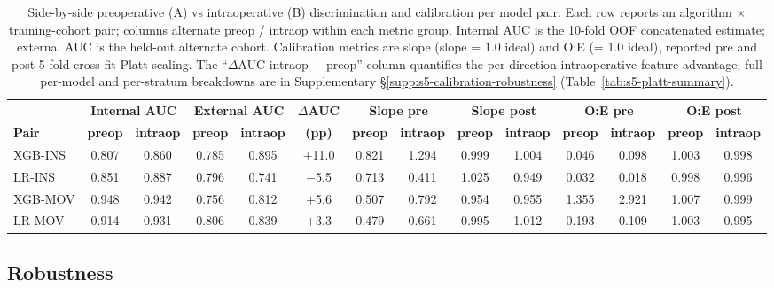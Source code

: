 \begin{table}
\centering
\caption{Side-by-side preoperative (A) vs intraoperative (B) discrimination
and calibration per model pair. Each row reports an algorithm
$\times$ training-cohort pair; columns alternate preop / intraop within
each metric group. Internal AUC is the 10-fold OOF concatenated estimate;
external AUC is the held-out alternate cohort. Calibration metrics are
slope (slope = 1.0 ideal) and O:E (= 1.0 ideal), reported pre and post
5-fold cross-fit Platt scaling. The ``$\Delta$AUC intraop $-$ preop'' column
quantifies the per-direction intraoperative-feature advantage; full
per-model and per-stratum breakdowns are in Supplementary
§\ref{supp:s5-calibration-robustness} (Table~\ref{tab:s5-platt-summary}).}
\label{tab:calibration}
\setlength{\tabcolsep}{6pt}
\small
\begin{tabular}{l|cc|cc|c|cc|cc|cc|cc}
\toprule
& \multicolumn{2}{c|}{\textbf{Internal AUC}} & \multicolumn{2}{c|}{\textbf{External AUC}} & \textbf{$\Delta$AUC} & \multicolumn{2}{c|}{\textbf{Slope pre}} & \multicolumn{2}{c|}{\textbf{Slope post}} & \multicolumn{2}{c|}{\textbf{O:E pre}} & \multicolumn{2}{c}{\textbf{O:E post}} \\
\textbf{Pair} & \textbf{preop} & \textbf{intraop} & \textbf{preop} & \textbf{intraop} & \textbf{(pp)} & \textbf{preop} & \textbf{intraop} & \textbf{preop} & \textbf{intraop} & \textbf{preop} & \textbf{intraop} & \textbf{preop} & \textbf{intraop} \\
\midrule
XGB-INS & 0.807 & 0.860 & 0.785 & 0.895 & $+$11.0 & 0.821 & 1.294 & 0.999 & 1.004 & 0.046 & 0.098 & 1.003 & 0.998 \\
LR-INS  & 0.851 & 0.887 & 0.796 & 0.741 & $-$5.5  & 0.713 & 0.411 & 1.025 & 0.949 & 0.032 & 0.018 & 0.998 & 0.996 \\
XGB-MOV & 0.948 & 0.942 & 0.756 & 0.812 & $+$5.6  & 0.507 & 0.792 & 0.954 & 0.955 & 1.355 & 2.921 & 1.007 & 0.999 \\
LR-MOV  & 0.914 & 0.931 & 0.806 & 0.839 & $+$3.3  & 0.479 & 0.661 & 0.995 & 1.012 & 0.193 & 0.109 & 1.003 & 0.995 \\
\bottomrule
\end{tabular}
\end{table}

\subsection{Robustness}
\label{sec:results:robustness}

